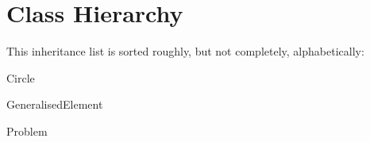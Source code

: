 \section{Class Hierarchy}
This inheritance list is sorted roughly, but not completely, alphabetically\+:\begin{DoxyCompactList}
\item Circle\begin{DoxyCompactList}
\item {}
\end{DoxyCompactList}
\item Generalised\+Element\begin{DoxyCompactList}
\item {}
\end{DoxyCompactList}
\item Problem\begin{DoxyCompactList}
\item {}
\end{DoxyCompactList}
\end{DoxyCompactList}
